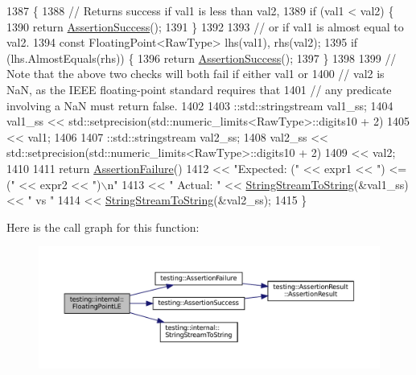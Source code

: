 \begin{DoxyCode}
1387                                               \{
1388   \textcolor{comment}{// Returns success if val1 is less than val2,}
1389   \textcolor{keywordflow}{if} (val1 < val2) \{
1390     \textcolor{keywordflow}{return} \hyperlink{namespacetesting_ac1d0baedb17286c5c6c87bd1a45da8ac}{AssertionSuccess}();
1391   \}
1392 
1393   \textcolor{comment}{// or if val1 is almost equal to val2.}
1394   \textcolor{keyword}{const} FloatingPoint<RawType> lhs(val1), rhs(val2);
1395   \textcolor{keywordflow}{if} (lhs.AlmostEquals(rhs)) \{
1396     \textcolor{keywordflow}{return} \hyperlink{namespacetesting_ac1d0baedb17286c5c6c87bd1a45da8ac}{AssertionSuccess}();
1397   \}
1398 
1399   \textcolor{comment}{// Note that the above two checks will both fail if either val1 or}
1400   \textcolor{comment}{// val2 is NaN, as the IEEE floating-point standard requires that}
1401   \textcolor{comment}{// any predicate involving a NaN must return false.}
1402 
1403   ::std::stringstream val1\_ss;
1404   val1\_ss << std::setprecision(std::numeric\_limits<RawType>::digits10 + 2)
1405           << val1;
1406 
1407   ::std::stringstream val2\_ss;
1408   val2\_ss << std::setprecision(std::numeric\_limits<RawType>::digits10 + 2)
1409           << val2;
1410 
1411   \textcolor{keywordflow}{return} \hyperlink{namespacetesting_a75cb789614cb1c28c34627a4a3c053df}{AssertionFailure}()
1412       << \textcolor{stringliteral}{"Expected: ("} << expr1 << \textcolor{stringliteral}{") <= ("} << expr2 << \textcolor{stringliteral}{")\(\backslash\)n"}
1413       << \textcolor{stringliteral}{"  Actual: "} << \hyperlink{namespacetesting_1_1internal_ac0a2b7f69fc829d80a39e925b6417e39}{StringStreamToString}(&val1\_ss) << \textcolor{stringliteral}{" vs "}
1414       << \hyperlink{namespacetesting_1_1internal_ac0a2b7f69fc829d80a39e925b6417e39}{StringStreamToString}(&val2\_ss);
1415 \}
\end{DoxyCode}
Here is the call graph for this function\+:
\nopagebreak
\begin{figure}[H]
\begin{center}
\leavevmode
\includegraphics[width=350pt]{namespacetesting_1_1internal_a17b52b6b1f81f6dcad5cc4d12e5173a6_cgraph}
\end{center}
\end{figure}
\mbox{\label{namespacetesting_1_1internal_a2135f223bf6b527729aeaa651115183b}} 
